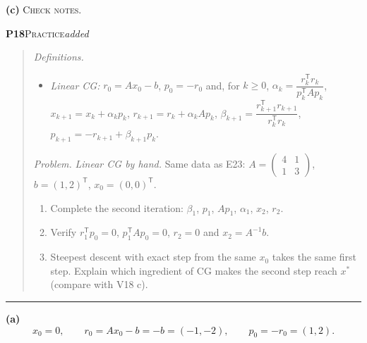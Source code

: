 \documentclass[11pt,a4paper]{article}
\newcommand{\T}{^{\mathsf T}}
\newcommand{\task}[3]{\par\medskip\noindent\textbf{#1}\quad\textsc{#2}\hfill\textit{#3}\par\smallskip}
\newenvironment{statement}{\begin{quote}\small}{\end{quote}\vspace{-0.3em}\noindent\textcolor{gray}{\rule{\linewidth}{0.6pt}}\par\medskip}
\begin{document}
\textbf{(c)} \textsc{Check notes}.

\task{P18}{Practice}{added}
\begin{statement}
\emph{Definitions.}
\begin{itemize}
\item \emph{Linear CG:} $r_0=Ax_0-b$, $p_0=-r_0$ and, for $k\ge0$, $\alpha_k=\dfrac{r_k\T r_k}{p_k\T Ap_k}$, $x_{k+1}=x_k+\alpha_kp_k$, $r_{k+1}=r_k+\alpha_kAp_k$, $\beta_{k+1}=\dfrac{r_{k+1}\T r_{k+1}}{r_k\T r_k}$, $p_{k+1}=-r_{k+1}+\beta_{k+1}p_k$.
\end{itemize}
\emph{Problem.} \emph{Linear CG by hand.} Same data as E23: $A=\begin{pmatrix}4&1\\1&3\end{pmatrix}$, $b=(1,2)\T$, $x_0=(0,0)\T$.
\begin{enumerate}[label=\alph*)]
\item Complete the second iteration: $\beta_1$, $p_1$, $Ap_1$, $\alpha_1$, $x_2$, $r_2$.
\item Verify $r_1\T p_0=0$, $p_1\T Ap_0=0$, $r_2=0$ and $x_2=A^{-1}b$.
\item Steepest descent with exact step from the same $x_0$ takes the same first step. Explain which ingredient of CG makes the second step reach $x^*$ (compare with V18 c).
\end{enumerate}
\end{statement}

\textbf{(a)}
\[
x_0=0,\qquad r_0=Ax_0-b=-b=(-1,-2),\qquad p_0=-r_0=(1,2).
\]
\end{document}
